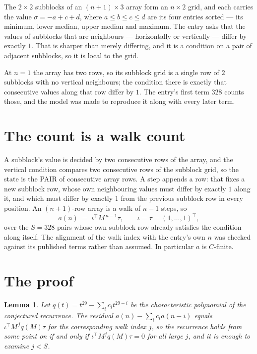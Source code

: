 \documentclass[11pt,a4paper]{article}
\theoremstyle{plain}
\newtheorem{lemma}[theorem]{Lemma}
\theoremstyle{definition}
\begin{document}
The $2\times2$ subblocks of an $(n+1)\times3$ array form an
$n\times2$ grid, and each carries the value $\sigma=-a+c+d$, where $a\le b\le c\le d$ are its four entries sorted --- its minimum, lower median, upper median and maximum. The entry asks that the values of
subblocks that are neighbours --- horizontally or vertically --- differ by exactly $1$.
That is sharper than merely differing, and it is a condition on a pair of adjacent subblocks,
so it is local to the grid.

At $n=1$ the array has two rows, so its subblock grid is a single row of $2$ subblocks with
no vertical neighbours; the condition there is exactly that consecutive values along that row
differ by $1$. The entry's first term $328$ counts those, and the model was made to
reproduce it along with every later term.

\section{The count is a walk count}

A subblock's value is decided by two consecutive rows of the array, and the
vertical condition compares two consecutive rows of the subblock grid, so the state is the
PAIR of consecutive array rows. A step appends a row: that fixes a new subblock row, whose own
neighbouring values must differ by exactly $1$ along it, and which must differ by exactly
$1$ from the previous subblock row in every position. An $(n+1)$-row array is a walk of
$n-1$ steps, so
\[
a(n)\;=\;\iota^{\!\top}M^{\,n-1}\tau,\qquad\iota=\tau=(1,\dots,1)^{\!\top},
\]
over the $S=328$ pairs whose own subblock row already satisfies the condition along itself.
The alignment of the walk index with the entry's own $n$ was checked against its published
terms rather than assumed. In particular $a$ is $C$-finite.

\section{The proof}

\begin{lemma}\label{lem:crit}
Let $q(t)=t^{29}-\sum_i c_it^{29-i}$ be the characteristic polynomial of the
conjectured recurrence. The residual $a(n)-\sum_ic_ia(n-i)$ equals
$\iota^{\!\top}M^{\,j}q(M)\tau$ for the corresponding walk index $j$, so the recurrence
holds from some point on if and only if $\iota^{\!\top}M^{j}q(M)\tau=0$ for all large $j$,
and it is enough to examine $j<S$.
\end{lemma}
\end{document}
